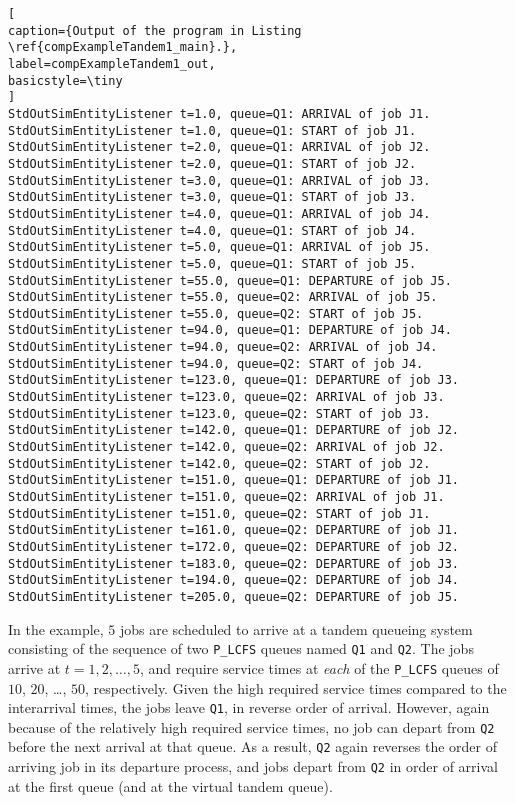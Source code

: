 \begin{lstlisting}[
caption={Output of the program in Listing \ref{compExampleTandem1_main}.},
label=compExampleTandem1_out,
basicstyle=\tiny
]
StdOutSimEntityListener t=1.0, queue=Q1: ARRIVAL of job J1.
StdOutSimEntityListener t=1.0, queue=Q1: START of job J1.
StdOutSimEntityListener t=2.0, queue=Q1: ARRIVAL of job J2.
StdOutSimEntityListener t=2.0, queue=Q1: START of job J2.
StdOutSimEntityListener t=3.0, queue=Q1: ARRIVAL of job J3.
StdOutSimEntityListener t=3.0, queue=Q1: START of job J3.
StdOutSimEntityListener t=4.0, queue=Q1: ARRIVAL of job J4.
StdOutSimEntityListener t=4.0, queue=Q1: START of job J4.
StdOutSimEntityListener t=5.0, queue=Q1: ARRIVAL of job J5.
StdOutSimEntityListener t=5.0, queue=Q1: START of job J5.
StdOutSimEntityListener t=55.0, queue=Q1: DEPARTURE of job J5.
StdOutSimEntityListener t=55.0, queue=Q2: ARRIVAL of job J5.
StdOutSimEntityListener t=55.0, queue=Q2: START of job J5.
StdOutSimEntityListener t=94.0, queue=Q1: DEPARTURE of job J4.
StdOutSimEntityListener t=94.0, queue=Q2: ARRIVAL of job J4.
StdOutSimEntityListener t=94.0, queue=Q2: START of job J4.
StdOutSimEntityListener t=123.0, queue=Q1: DEPARTURE of job J3.
StdOutSimEntityListener t=123.0, queue=Q2: ARRIVAL of job J3.
StdOutSimEntityListener t=123.0, queue=Q2: START of job J3.
StdOutSimEntityListener t=142.0, queue=Q1: DEPARTURE of job J2.
StdOutSimEntityListener t=142.0, queue=Q2: ARRIVAL of job J2.
StdOutSimEntityListener t=142.0, queue=Q2: START of job J2.
StdOutSimEntityListener t=151.0, queue=Q1: DEPARTURE of job J1.
StdOutSimEntityListener t=151.0, queue=Q2: ARRIVAL of job J1.
StdOutSimEntityListener t=151.0, queue=Q2: START of job J1.
StdOutSimEntityListener t=161.0, queue=Q2: DEPARTURE of job J1.
StdOutSimEntityListener t=172.0, queue=Q2: DEPARTURE of job J2.
StdOutSimEntityListener t=183.0, queue=Q2: DEPARTURE of job J3.
StdOutSimEntityListener t=194.0, queue=Q2: DEPARTURE of job J4.
StdOutSimEntityListener t=205.0, queue=Q2: DEPARTURE of job J5.
\end{lstlisting}

In the example, $5$ jobs are scheduled to arrive at
  a tandem queueing system consisting of
  the sequence of
  two \lstinline|P_LCFS| queues
  named
  \lstinline|Q1| and \lstinline|Q2|.
The jobs arrive at $t=1, 2, \dots, 5$,
  and require service times at {\em each\/} of the \lstinline|P_LCFS| queues
  of $10$, $20$, \ldots, $50$, respectively.
Given the high required service times compared to the
  interarrival times,
  the jobs leave \lstinline|Q1|,
  in reverse order of arrival.
However, again because of the relatively high required service times,
  no job can depart from \lstinline|Q2| before the next arrival
  at that queue.
As a result,
  \lstinline|Q2| again reverses the order of arriving job in its departure
  process, and jobs depart from \lstinline|Q2| in order of arrival at the first queue
  (and at the virtual tandem queue).

